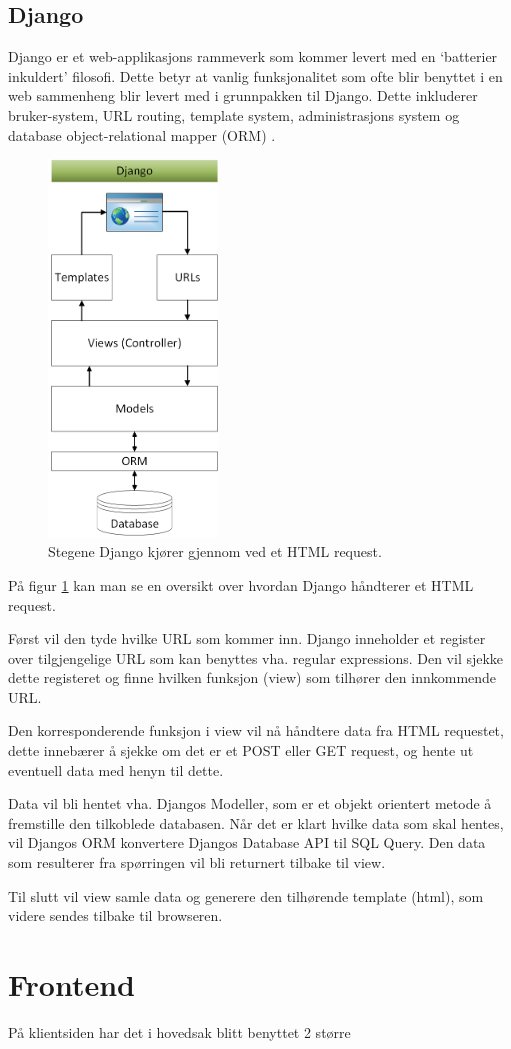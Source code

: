 \subsection{Django}
Django er et web-applikasjons rammeverk som kommer levert med en ‘batterier inkuldert' filosofi. Dette betyr at vanlig funksjonalitet som ofte blir benyttet i en web sammenheng blir levert med i grunnpakken til Django. Dette inkluderer bruker-system, URL routing, template system, administrasjons system og database object-relational mapper (ORM) \cite{django:what}.



\begin{figure}
\caption[Django Oversikt]{Stegene Django kjører gjennom ved et HTML request. }\label{wrap-fig:1}
\includegraphics[width=4.5cm]{Bilder/django.png}
\end{figure}

På figur \ref{wrap-fig:1} kan man se en oversikt over hvordan Django håndterer et HTML request. 

Først vil den tyde hvilke URL som kommer inn. Django inneholder et register over tilgjengelige URL som kan benyttes vha. regular expressions. Den vil sjekke dette registeret og finne hvilken funksjon (view) som tilhører den innkommende URL.

Den korresponderende funksjon i view vil nå håndtere data fra HTML requestet, dette innebærer å sjekke om det er et POST eller GET request, og hente ut eventuell data med henyn til dette. 

Data vil bli hentet vha. Djangos Modeller, som er et objekt orientert metode å fremstille den tilkoblede databasen. Når det er klart hvilke data som skal hentes, vil Djangos ORM konvertere Djangos Database API til SQL Query. Den data som resulterer fra spørringen vil bli returnert tilbake til view.

Til slutt vil view samle data og generere den tilhørende template (html), som videre sendes tilbake til browseren.



\section{Frontend}
På klientsiden har det i hovedsak blitt benyttet 2 større 

